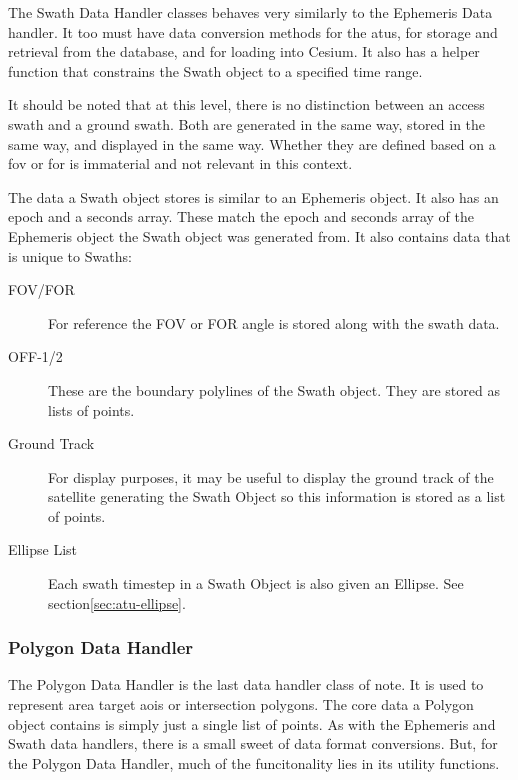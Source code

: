 The Swath Data Handler classes behaves very similarly to the Ephemeris Data
handler. It too must have data conversion methods for the \glspl{atu}, for
storage and retrieval from the database, and for loading into Cesium. It also
has a helper function that constrains the Swath object to a specified time
range. 

It should be noted that at this level, there is no distinction between an
access swath and a ground swath. Both are generated in the same way, stored in
the same way, and displayed in the same way. Whether they are defined based on
a \gls{fov} or \gls{for} is immaterial and not relevant in this context. 

The data a Swath object stores is similar to an Ephemeris object. It
also has an epoch and a seconds array. These match the epoch and seconds array
of the Ephemeris object the Swath object was generated from. It also contains
data that is unique to Swaths:

\begin{description} 

    \item[FOV/FOR] For reference the FOV or FOR angle is stored along with the
	swath data.

    \item[OFF-1/2] These are the boundary polylines of the Swath object. They
	are stored as lists of points.

    \item[Ground Track] For display purposes, it may be useful to display the
	ground track of the satellite generating the Swath Object so this
	information is stored as a list of points.

    \item[Ellipse List] Each swath timestep in a Swath Object is also given an
	Ellipse. See section\ref{sec:atu-ellipse}.

\end{description}


\subsubsection{Polygon Data Handler}

The Polygon Data Handler is the last data handler class of note. It is used to
represent area target \glspl{aoi} or intersection polygons. The core data a
Polygon object contains is simply just a single list of points.  As with the
Ephemeris and Swath data handlers, there is a small sweet of data format
conversions.  But, for the Polygon Data Handler, much of the funcitonality lies
in its utility functions.

